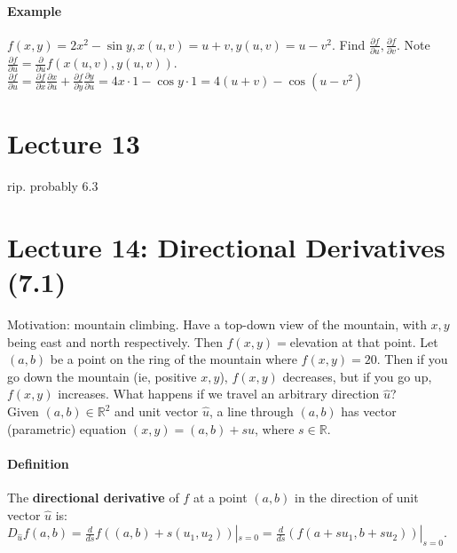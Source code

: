 \documentclass[tikz,10pt,letter]{article}
\theoremstyle{plain}
\theoremstyle{definition}
\begin{document}
\paragraph{Example}
$f(x,y)=2x^2-\sin y, x(u,v)=u+v,y(u,v)=u-v^2$. Find $\frac{\partial f}{\partial u},\frac{\partial f}{\partial v}$. Note $\frac{\partial f}{\partial u}=\frac{\partial}{\partial u}f(x(u,v),y(u,v))$. $\frac{\partial f}{\partial u}=\frac{\partial f}{\partial x}\frac{\partial x}{\partial u}+\frac{\partial f}{\partial y}\frac{\partial y}{\partial u}=4x\cdot1-\cos y\cdot1=4(u+v)-\cos(u-v^2)$

\section*{Lecture 13}
rip. probably 6.3

\section*{Lecture 14: Directional Derivatives (7.1)}
Motivation: mountain climbing. Have a top-down view of the mountain, with $x,y$ being east and north respectively. Then $f(x,y)=$elevation at that point. Let $(a,b)$ be a point on the ring of the mountain where $f(x,y)=20$. Then if you go down the mountain (ie, positive $x,y$), $f(x,y)$ decreases, but if you go up, $f(x,y)$ increases. What happens if we travel an arbitrary direction $\hat{u}$? \\ 
Given $(a,b)\in\mathbb{R}^2$ and unit vector $\hat{u}$, a line through $(a,b)$ has vector (parametric) equation $(x,y)=(a,b)+s\hat{u}$, where $s\in\mathbb{R}$.  
\paragraph{Definition} The \textbf{directional derivative} of $f$ at a point $(a,b)$ in the direction of unit vector $\hat{u}$ is: $D_{\hat{u}}f(a,b)=\frac{d}{ds}f((a,b)+s(u_1,u_2))|_{s=0}=\frac{d}{ds}(f(a+su_1,b+su_2))|_{s=0}$. 
\end{document}
